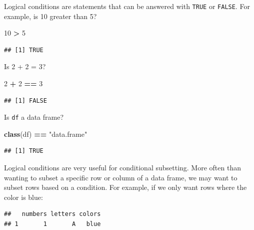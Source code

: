 \documentclass[
]{book}
\newenvironment{Shaded}{\begin{snugshade}}{\end{snugshade}}
\newcommand{\DecValTok}[1]{\textcolor[rgb]{0.00,0.00,0.81}{#1}}
\newcommand{\FunctionTok}[1]{\textcolor[rgb]{0.13,0.29,0.53}{\textbf{#1}}}
\newcommand{\NormalTok}[1]{#1}
\newcommand{\SpecialCharTok}[1]{\textcolor[rgb]{0.81,0.36,0.00}{\textbf{#1}}}
\newcommand{\StringTok}[1]{\textcolor[rgb]{0.31,0.60,0.02}{#1}}
\begin{document}
Logical conditions are statements that can be answered with \texttt{TRUE} or \texttt{FALSE}.
For example, is 10 greater than 5?

\begin{Shaded}
\begin{Highlighting}[]
\DecValTok{10} \SpecialCharTok{\textgreater{}} \DecValTok{5}
\end{Highlighting}
\end{Shaded}

\begin{verbatim}
## [1] TRUE
\end{verbatim}

Is 2 + 2 = 3?

\begin{Shaded}
\begin{Highlighting}[]
\DecValTok{2} \SpecialCharTok{+} \DecValTok{2} \SpecialCharTok{==} \DecValTok{3}
\end{Highlighting}
\end{Shaded}

\begin{verbatim}
## [1] FALSE
\end{verbatim}

Is \texttt{df} a data frame?

\begin{Shaded}
\begin{Highlighting}[]
\FunctionTok{class}\NormalTok{(df) }\SpecialCharTok{==} \StringTok{"data.frame"}
\end{Highlighting}
\end{Shaded}

\begin{verbatim}
## [1] TRUE
\end{verbatim}

Logical conditions are very useful for conditional subsetting. More often than
wanting to subset a specific row or column of a data frame, we may want to
subset rows based on a condition. For example, if we only want rows where the
color is blue:

\begin{Shaded}
\end{Shaded}

\begin{verbatim}
##   numbers letters colors
## 1       1       A   blue
\end{verbatim}
\end{document}
